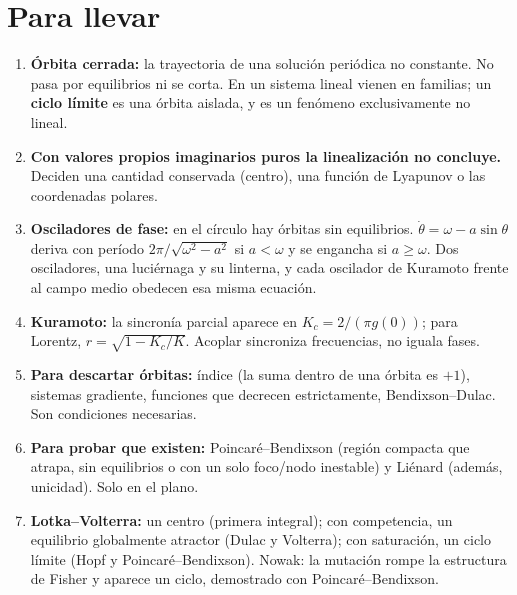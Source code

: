 \section{Para llevar}
\label{sec:oc-cierre}

\begin{parallevar}
\begin{enumerate}
  \item \textbf{Órbita cerrada:} la trayectoria de una solución periódica no constante. No pasa por equilibrios ni se corta. En un sistema lineal vienen en familias; un \textbf{ciclo límite} es una órbita aislada, y es un fenómeno exclusivamente no lineal.
  \item \textbf{Con valores propios imaginarios puros la linealización no concluye.} Deciden una cantidad conservada (centro), una función de Lyapunov o las coordenadas polares.
  \item \textbf{Osciladores de fase:} en el círculo hay órbitas sin equilibrios. $\dot\theta=\omega-a\sin\theta$ deriva con período $2\pi/\sqrt{\omega^2-a^2}$ si $a<\omega$ y se engancha si $a\ge\omega$. Dos osciladores, una luciérnaga y su linterna, y cada oscilador de Kuramoto frente al campo medio obedecen esa misma ecuación.
  \item \textbf{Kuramoto:} la sincronía parcial aparece en $K_c=2/(\pi g(0))$; para Lorentz, $r=\sqrt{1-K_c/K}$. Acoplar sincroniza frecuencias, no iguala fases.
  \item \textbf{Para descartar órbitas:} índice (la suma dentro de una órbita es $+1$), sistemas gradiente, funciones que decrecen estrictamente, Bendixson--Dulac. Son condiciones necesarias.
  \item \textbf{Para probar que existen:} Poincaré--Bendixson (región compacta que atrapa, sin equilibrios o con un solo foco/nodo inestable) y Liénard (además, unicidad). Solo en el plano.
  \item \textbf{Lotka--Volterra:} un centro (primera integral); con competencia, un equilibrio globalmente atractor (Dulac y Volterra); con saturación, un ciclo límite (Hopf y Poincaré--Bendixson). Nowak: la mutación rompe la estructura de Fisher y aparece un ciclo, demostrado con Poincaré--Bendixson.
\end{enumerate}
\end{parallevar}

